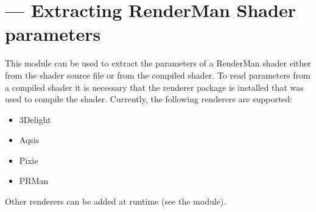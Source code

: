 \section{ ---
          Extracting RenderMan Shader parameters}
\label{slparams}


This module can be used to extract the parameters of a RenderMan
shader either from the shader source file or from the compiled shader.
To read parameters from a compiled shader it is necessary that the renderer
package is installed that was used to compile the shader. Currently, the
following renderers are supported:

\begin{itemize}
  \item 3Delight 
  \item Aqsis
  \item Pixie
  \item PRMan
\end{itemize}

Other renderers can be added at runtime (see the  module).

